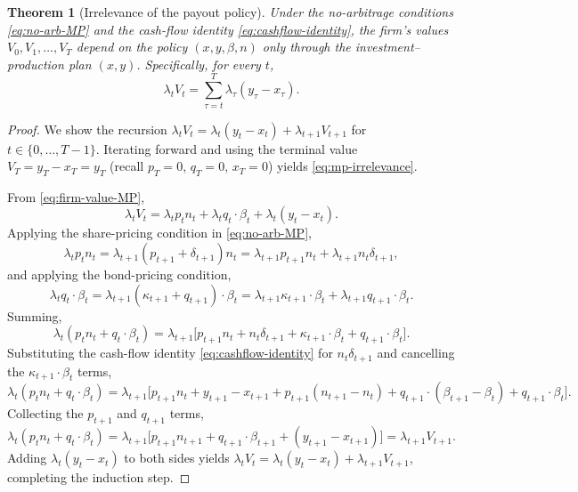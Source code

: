 \documentclass[11pt,a4paper,oneside]{book}
\theoremstyle{plain}
\newtheorem{theorem}{Theorem}[chapter]
\theoremstyle{definition}
\theoremstyle{remark}
\numberwithin{equation}{chapter}
\begin{document}
\begin{theorem}[Irrelevance of the payout policy]\label{thm:payout-irrelevance}
Under the no-arbitrage conditions \eqref{eq:no-arb-MP} and the cash-flow identity \eqref{eq:cashflow-identity}, the firm's values $V_0, V_1, \ldots, V_T$ depend on the policy $(x, y, \beta, n)$ only through the investment--production plan $(x, y)$.
Specifically, for every $t$,
\begin{equation}\label{eq:mp-irrelevance}
  \lambda_t V_t = \sum_{\tau = t}^{T} \lambda_\tau (y_\tau - x_\tau).
\end{equation}
\end{theorem}

\begin{proof}
We show the recursion $\lambda_t V_t = \lambda_t (y_t - x_t) + \lambda_{t+1} V_{t+1}$ for $t \in \{0, \ldots, T-1\}$.
Iterating forward and using the terminal value $V_T = y_T - x_T = y_T$ (recall $p_T = 0$, $q_T = 0$, $x_T = 0$) yields \eqref{eq:mp-irrelevance}.

From \eqref{eq:firm-value-MP},
\begin{equation*}
  \lambda_t V_t = \lambda_t p_t n_t + \lambda_t q_t \cdot \beta_t + \lambda_t (y_t - x_t).
\end{equation*}
Applying the share-pricing condition in \eqref{eq:no-arb-MP},
\begin{equation*}
  \lambda_t p_t n_t = \lambda_{t+1} (p_{t+1} + \delta_{t+1}) n_t = \lambda_{t+1} p_{t+1} n_t + \lambda_{t+1} n_t \delta_{t+1},
\end{equation*}
and applying the bond-pricing condition,
\begin{equation*}
  \lambda_t q_t \cdot \beta_t = \lambda_{t+1} (\kappa_{t+1} + q_{t+1}) \cdot \beta_t = \lambda_{t+1} \kappa_{t+1} \cdot \beta_t + \lambda_{t+1} q_{t+1} \cdot \beta_t.
\end{equation*}
Summing,
\begin{equation*}
  \lambda_t (p_t n_t + q_t \cdot \beta_t)
  = \lambda_{t+1} \bigl[ p_{t+1} n_t + n_t \delta_{t+1} + \kappa_{t+1} \cdot \beta_t + q_{t+1} \cdot \beta_t \bigr].
\end{equation*}
Substituting the cash-flow identity \eqref{eq:cashflow-identity} for $n_t \delta_{t+1}$ and cancelling the $\kappa_{t+1} \cdot \beta_t$ terms,
\begin{equation*}
  \lambda_t (p_t n_t + q_t \cdot \beta_t)
  = \lambda_{t+1} \bigl[ p_{t+1} n_t + y_{t+1} - x_{t+1} + p_{t+1} (n_{t+1} - n_t) + q_{t+1} \cdot (\beta_{t+1} - \beta_t) + q_{t+1} \cdot \beta_t \bigr].
\end{equation*}
Collecting the $p_{t+1}$ and $q_{t+1}$ terms,
\begin{equation*}
  \lambda_t (p_t n_t + q_t \cdot \beta_t)
  = \lambda_{t+1} \bigl[ p_{t+1} n_{t+1} + q_{t+1} \cdot \beta_{t+1} + (y_{t+1} - x_{t+1}) \bigr]
  = \lambda_{t+1} V_{t+1}.
\end{equation*}
Adding $\lambda_t (y_t - x_t)$ to both sides yields $\lambda_t V_t = \lambda_t (y_t - x_t) + \lambda_{t+1} V_{t+1}$, completing the induction step.
\end{proof}
\end{document}

